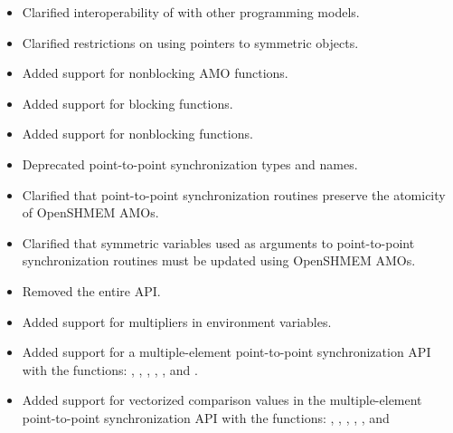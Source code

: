 \begin{itemize}
{  subsec:shmem_broadcast,
  subsec:shmem_collect,
  subsec:shmem_reductions}%
%
\item Clarified interoperability of \openshmem with other programming models.
%
%
\item Clarified restrictions on using pointers to symmetric objects.
%
%
\item Added support for nonblocking \ac{AMO} functions.
%
%
\item Added support for blocking  functions.
%
%
\item Added support for nonblocking  functions.
%
%
\item Deprecated point-to-point synchronization types and names.
%
%
\item Clarified that point-to-point synchronization routines preserve the
  atomicity of OpenSHMEM \acp{AMO}.
%
%
\item Clarified that symmetric variables used as  arguments to
  point-to-point synchronization routines must be updated using OpenSHMEM
  \acp{AMO}.
%
%
\item Removed the entire \openshmem \Fortran \ac{API}.
%
%
\item Added support for multipliers in 
environment variables.
%
%
\item Added support for a multiple-element point-to-point synchronization \ac{API} with
  the functions: , ,
  , ,
  , and .
%
%
\item Added support for vectorized comparison values in the multiple-element
  point-to-point synchronization \ac{API} with the functions:
  , ,
  ,
  , , and

\end{itemize}
